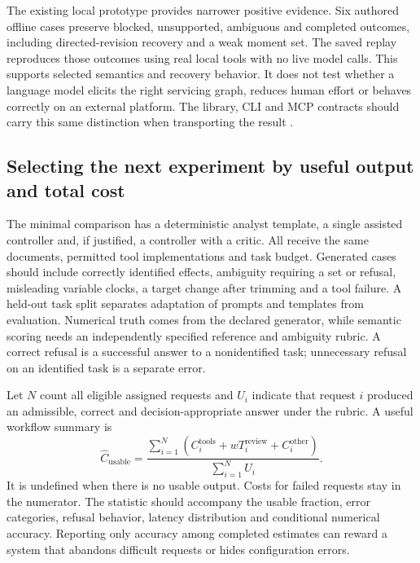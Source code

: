 The existing local prototype provides narrower positive evidence. Six authored
offline cases preserve blocked, unsupported, ambiguous and completed outcomes,
including directed-revision recovery and a weak moment set. The saved replay
reproduces those outcomes using real local tools with no live model calls.
This supports selected semantics and recovery behavior. It does not test
whether a language model elicits the right servicing graph, reduces human
effort or behaves correctly on an external platform. The library, CLI and MCP
contracts should carry this same distinction when transporting the result
\citep{exec13_architecture_local}.

\subsection{Selecting the next experiment by useful output and total cost}

The minimal comparison has a deterministic analyst template, a single assisted
controller and, if justified, a controller with a critic. All receive the same
documents, permitted tool implementations and task budget. Generated cases
should include correctly identified effects, ambiguity requiring a set or
refusal, misleading variable clocks, a target change after trimming and a tool
failure. A held-out task split separates adaptation of prompts and templates
from evaluation. Numerical truth comes from the declared generator, while
semantic scoring needs an independently specified reference and ambiguity
rubric. A correct refusal is a successful answer to a nonidentified task;
unnecessary refusal on an identified task is a separate error.

Let $N$ count all eligible assigned requests and $U_i$ indicate that request
$i$ produced an admissible, correct and decision-appropriate answer under the
rubric. A useful workflow summary is
\begin{equation}
 \widehat C_{\mathrm{usable}}=
 \frac{\sum_{i=1}^N(C_i^{\mathrm{tools}}+wT_i^{\mathrm{review}}
                         +C_i^{\mathrm{other}})}{\sum_{i=1}^N U_i}.
 \label{exec13:architecture-cost}
\end{equation}
It is undefined when there is no usable output. Costs for failed requests stay
in the numerator. The statistic should accompany the usable fraction, error
categories, refusal behavior, latency distribution and conditional numerical
accuracy. Reporting only accuracy among completed estimates can reward a system
that abandons difficult requests or hides configuration errors.

